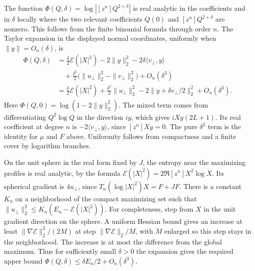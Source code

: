 \documentclass[11pt]{article}
\begin{document}
The function \(\Phi(Q,\delta)=\log|[z^n]Q^{2+\delta}|\)
is real analytic in the coefficients and in \(\delta\) locally
where the two relevant coefficients \(Q(0)\) and \([z^n]Q^{2+\delta}\)
are nonzero. This follows from the finite binomial formula
through order \(n\). The Taylor expansion in the displayed
normal coordinates, uniformly when \(\|y\|=O_n(\delta)\), is
\begin{align*}
 \Phi(Q,\delta)
 &=\frac{\delta}{2}\mathcal E(|X|^2)
   -2\|y\|_2^2-2\delta\langle v_\perp,y\rangle\\
 &\quad+\frac{\delta^2}{2}
          \bigl(\|u_\perp\|_2^2-\|v_\perp\|_2^2\bigr)
          +O_n(\delta^3)\\
 &=\frac{\delta}{2}\mathcal E(|X|^2)
   +\frac{\delta^2}{2}\|u_\perp\|_2^2
   -2\bigl\|y+\delta v_\perp/2\bigr\|_2^2
   +O_n(\delta^3).
\end{align*}
Here \(\Phi(Q,0)=\log(1-2\|y\|_2^2)\).
The mixed term comes from differentiating \(Q^2\log Q\)
in the direction \(i y\), which gives
\(i Xy(2L+1)\). Its real coefficient at degree \(n\) is
\(-2\langle v_\perp,y\rangle\), since \([z^n]Xy=0\).
The pure \(\delta^2\) term is the identity for \(\mu\) and \(F\)
above. Uniformity follows from compactness and a finite cover
by logarithm branches.

On the unit sphere in the real form fixed by \(J\), the entropy
near the maximizing profiles is real analytic, by the formula
\(\mathcal E(|X|^2)=2\Re[z^n]X^2\log X\).
Its spherical gradient is \(4u_\perp\), since
\(T_n(\log|X|^2)X=F+JF\).
There is a constant \(K_n\) on a neighborhood of the compact
maximizing set such that
\(\|u_\perp\|_2^2\leq K_n(E_n-\mathcal E(|X|^2))\).
For completeness, step from \(X\) in the unit gradient direction
on the sphere. A uniform Hessian bound gives an increase at least
\(\|\nabla\mathcal E\|_2^2/(2M)\) at step
\(\|\nabla\mathcal E\|_2/M\), with \(M\) enlarged so this step
stays in the neighborhood. The increase is at most the
difference from the global maximum. Thus for sufficiently small
\(\delta>0\) the expansion gives the required upper bound
\(\Phi(Q,\delta)\leq\delta E_n/2+O_n(\delta^3)\).
\end{document}
